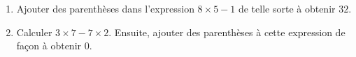 
\begin{exercice}\label{exosmath-0820}

    \begin{enumerate}
        \item
            Ajouter des parenthèses dans l'expression \( 8\times 5-1\) de telle sorte à obtenir \( 32\).
        \item
            Calculer \( 3\times 7-7\times 2\). Ensuite, ajouter des parenthèses à cette expression de façon à obtenir \( 0\).
    \end{enumerate}

\end{exercice}
